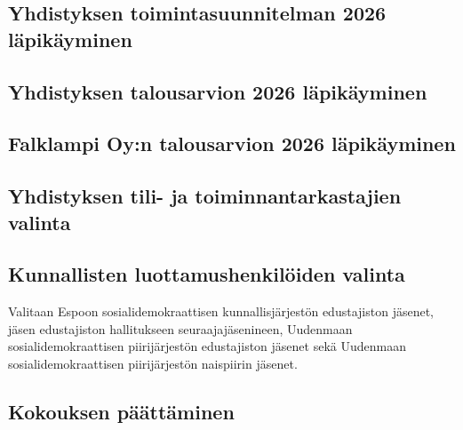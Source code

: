 \documentclass[a4paper,12pt]{article}
\begin{document}
\subsection{Yhdistyksen toimintasuunnitelman 2026 läpikäyminen}
\subsection{Yhdistyksen talousarvion 2026 läpikäyminen}
\subsection{Falklampi Oy:n talousarvion 2026 läpikäyminen}
\subsection{Yhdistyksen tili- ja toiminnantarkastajien valinta}
\subsection{Kunnallisten luottamushenkilöiden valinta}
Valitaan Espoon sosialidemokraattisen kunnallisjärjestön edustajiston jäsenet, jäsen edustajiston hallitukseen seuraajajäsenineen, Uudenmaan sosialidemokraattisen piirijärjestön edustajiston jäsenet sekä Uudenmaan sosialidemokraattisen piirijärjestön naispiirin jäsenet.
\subsection{Kokouksen päättäminen}
\end{document}

